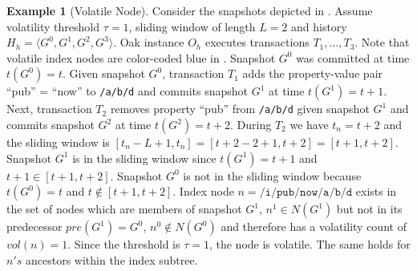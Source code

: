 \documentclass[abstracton,12pt]{scrartcl}
\theoremstyle{definition}
\newtheorem{example}{Example}
\begin{document}
\begin{example}[Volatile Node]
  Consider the snapshots depicted in . Assume volatility
  threshold $\tau = 1$, sliding window of length $L = 2$ and history $H_h
  = \langle G^0,G^1,G^2,G^3 \rangle$. Oak instance $O_h$ executes transactions
  $T_1, \dots , T_3$. Note that volatile index nodes are color-coded
  blue in . Snapshot $G^0$ was committed at time
  $t(G^0) = t$. Given snapshot $G^0$,
  transaction $T_1$ adds the property-value pair ``pub'' = ``now'' to
  \texttt{/a/b/d} and commits snapshot $G^1$ at time $t(G^1) = t + 1$. Next,
  transaction $T_2$ removes property ``pub'' from \texttt{/a/b/d} given snapshot
  $G^1$ and commits snapshot $G^2$ at time $t(G^2) = t + 2$. During $T_2$ we
  have $t_n=t+2$ and the sliding window is $[t_n-L+1,t_n] = [t+2-2+1,t+2] =
  [t+1,t+2]$. Snapshot $G^1$ is in the sliding window since $t(G^1)=t+1$ and
  $t+1 \in [t+1,t+2]$.
  Snapshot $G^0$ is not in the sliding window because $t(G^0) = t$ and $t \notin
  [t+1,t+2]$. Index node $n = \texttt{/i/pub/now/a/b/d}$ exists in the set of
  nodes which are members of snapshot $G^1$, $n^1 \in N(G^1)$ but not in its
  predecessor $pre(G^1) = G^0$, $n^0 \notin N(G^0)$ and therefore has a volatility
  count of $vol(n) = 1$. Since the threshold is $\tau = 1$, the node is
  volatile. The same holds for $n's$ ancestors within the index subtree.

  \label{ex:volatile_node}
\end{example}

\vspace{-1mm}
\end{document}
